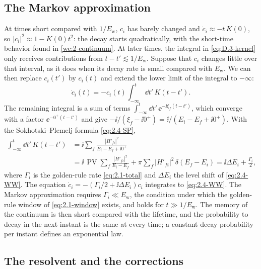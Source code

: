 \subsection*{The Markov approximation}

At times short compared with $1/E_{\mathrm{w}}$, $c_i$ has barely changed and $\dot c_i \approx -t\,K(0)$, so $|c_i|^2 \approx 1 - K(0)t^2$: the decay starts quadratically, with the short-time behavior found in \cref{we:2-continuum}. At later times, the integral in \cref{eq:D.3-kernel} only receives contributions from $t - t' \lesssim 1/E_{\mathrm{w}}$. Suppose that $c_i$ changes little over that interval, as it does when its decay rate is small compared with $E_{\mathrm{w}}$. We can then replace $c_i(t')$ by $c_i(t)$ and extend the lower limit of the integral to $-\infty$:
\begin{equation*}
  \dot c_i(t) = -c_i(t)\int_{-\infty}^{t}\dd t'\,K(t - t') .
\end{equation*}
The remaining integral is a sum of terms $\int_{-\infty}^{t}\dd t'\,\ee^{-\ii\xi_f(t - t')}$, which converge with a factor $\ee^{-0^+(t - t')}$ and give $-\ii/(\xi_f - \ii0^+) = \ii/(E_i - E_f + \ii0^+)$. With the Sokhotski--Plemelj formula \cref{eq:2.4-SP},
\begin{equation}
  \begin{split}
  \int_{-\infty}^{t}\dd t'\,K(t - t') &= \ii\sum_f\frac{|H'_{fi}|^2}{E_i - E_f + \ii0^+}\\
  &= \ii\,\operatorname{PV}\sum_f\frac{|H'_{fi}|^2}{E_i - E_f} + \pi\sum_f|H'_{fi}|^2\,\delta(E_f - E_i)
  = \ii\Delta E_i + \frac{\varGamma_i}{2} ,
  \end{split}
  \label{eq:D.3-markov}
\end{equation}
where $\varGamma_i$ is the golden-rule rate \cref{eq:2.1-total} and $\Delta E_i$ the level shift of \cref{eq:2.4-WW}. The equation $\dot c_i = -(\varGamma_i/2 + \ii\Delta E_i)c_i$ integrates to \cref{eq:2.4-WW}. The Markov approximation requires $\varGamma_i \ll E_{\mathrm{w}}$, the condition under which the golden-rule window of \cref{eq:2.1-window} exists, and holds for $t \gg 1/E_{\mathrm{w}}$. The memory of the continuum is then short compared with the lifetime, and the probability to decay in the next instant is the same at every time; a constant decay probability per instant defines an exponential law.

\subsection*{The resolvent and the corrections}

